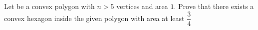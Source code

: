 Let  be a convex polygon with $n >5$ vertices and area $1$. Prove  that there exists a convex hexagon inside the given polygon with area at least $\dfrac{3}{4}$